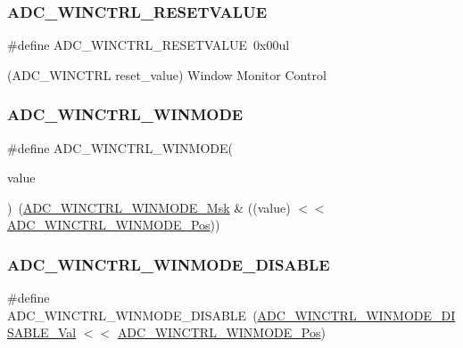 \subsubsection{\texorpdfstring{ADC\_WINCTRL\_RESETVALUE}{ADC\_WINCTRL\_RESETVALUE}}
{\footnotesize\ttfamily \#define A\+D\+C\+\_\+\+W\+I\+N\+C\+T\+R\+L\+\_\+\+R\+E\+S\+E\+T\+V\+A\+L\+UE~0x00ul}



(A\+D\+C\+\_\+\+W\+I\+N\+C\+T\+RL reset\+\_\+value) Window Monitor Control 

\mbox{\label{group___s_a_m_d21___a_d_c_ga44f097e60b7ac4aabf3fdd8832c945e4}} 
\subsubsection{\texorpdfstring{ADC\_WINCTRL\_WINMODE}{ADC\_WINCTRL\_WINMODE}}
{\footnotesize\ttfamily \#define A\+D\+C\+\_\+\+W\+I\+N\+C\+T\+R\+L\+\_\+\+W\+I\+N\+M\+O\+DE(\begin{DoxyParamCaption}\item[{}]{value }\end{DoxyParamCaption})~(\mbox{\hyperlink{group___s_a_m_d21___a_d_c_ga245ed425eeaf42951ac8868ac9409e21}{A\+D\+C\+\_\+\+W\+I\+N\+C\+T\+R\+L\+\_\+\+W\+I\+N\+M\+O\+D\+E\+\_\+\+Msk}} \& ((value) $<$$<$ \mbox{\hyperlink{group___s_a_m_d21___a_d_c_ga5c7a53123f9ec54b3295fc3850240fff}{A\+D\+C\+\_\+\+W\+I\+N\+C\+T\+R\+L\+\_\+\+W\+I\+N\+M\+O\+D\+E\+\_\+\+Pos}}))}

\mbox{\label{group___s_a_m_d21___a_d_c_ga2972b42613490fa83a1fdcee828a6f33}} 
\subsubsection{\texorpdfstring{ADC\_WINCTRL\_WINMODE\_DISABLE}{ADC\_WINCTRL\_WINMODE\_DISABLE}}
{\footnotesize\ttfamily \#define A\+D\+C\+\_\+\+W\+I\+N\+C\+T\+R\+L\+\_\+\+W\+I\+N\+M\+O\+D\+E\+\_\+\+D\+I\+S\+A\+B\+LE~(\mbox{\hyperlink{group___s_a_m_d21___a_d_c_gad426ea343c795919514df5154a43ad1c}{A\+D\+C\+\_\+\+W\+I\+N\+C\+T\+R\+L\+\_\+\+W\+I\+N\+M\+O\+D\+E\+\_\+\+D\+I\+S\+A\+B\+L\+E\+\_\+\+Val}} $<$$<$ \mbox{\hyperlink{group___s_a_m_d21___a_d_c_ga5c7a53123f9ec54b3295fc3850240fff}{A\+D\+C\+\_\+\+W\+I\+N\+C\+T\+R\+L\+\_\+\+W\+I\+N\+M\+O\+D\+E\+\_\+\+Pos}})}

